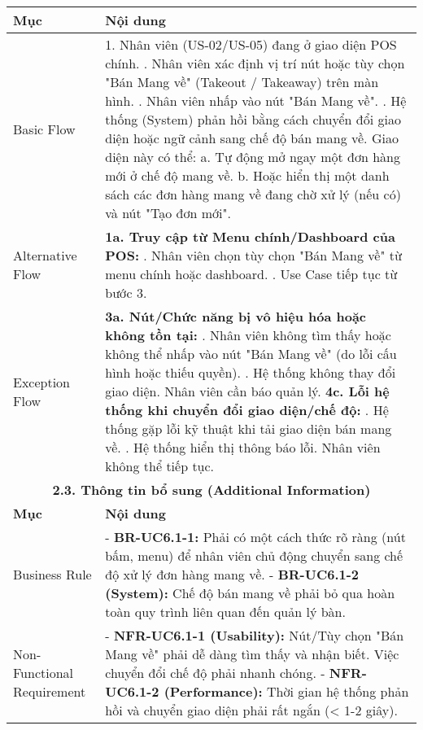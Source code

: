 \begin{longtable}{|m{4cm}|p{11cm}|}
\hline
\textbf{Mục} & \textbf{Nội dung} \\
\hline
Basic Flow & 1. Nhân viên (US-02/US-05) đang ở giao diện POS chính. \newline 2. Nhân viên xác định vị trí nút hoặc tùy chọn "Bán Mang về" (Takeout / Takeaway) trên màn hình. \newline 3. Nhân viên nhấp vào nút "Bán Mang về". \newline 4. Hệ thống (System) phản hồi bằng cách chuyển đổi giao diện hoặc ngữ cảnh sang chế độ bán mang về. Giao diện này có thể: \newline    a. Tự động mở ngay một đơn hàng mới ở chế độ mang về. \newline    b. Hoặc hiển thị một danh sách các đơn hàng mang về đang chờ xử lý (nếu có) và nút "Tạo đơn mới". \\
\hline
Alternative Flow & \textbf{1a. Truy cập từ Menu chính/Dashboard của POS:} \newline    1. Nhân viên chọn tùy chọn "Bán Mang về" từ menu chính hoặc dashboard. \newline    2. Use Case tiếp tục từ bước 3. \\
\hline
Exception Flow & \textbf{3a. Nút/Chức năng bị vô hiệu hóa hoặc không tồn tại:} \newline    1. Nhân viên không tìm thấy hoặc không thể nhấp vào nút "Bán Mang về" (do lỗi cấu hình hoặc thiếu quyền). \newline    2. Hệ thống không thay đổi giao diện. Nhân viên cần báo quản lý. \newline \textbf{4c. Lỗi hệ thống khi chuyển đổi giao diện/chế độ:} \newline    1. Hệ thống gặp lỗi kỹ thuật khi tải giao diện bán mang về. \newline    2. Hệ thống hiển thị thông báo lỗi. Nhân viên không thể tiếp tục. \\
\hline
\multicolumn{2}{|c|}{\textbf{2.3. Thông tin bổ sung (Additional Information)}} \\
\hline
\textbf{Mục} & \textbf{Nội dung} \\
\hline
Business Rule & - \textbf{BR-UC6.1-1:} Phải có một cách thức rõ ràng (nút bấm, menu) để nhân viên chủ động chuyển sang chế độ xử lý đơn hàng mang về. \newline - \textbf{BR-UC6.1-2 (System):} Chế độ bán mang về phải bỏ qua hoàn toàn quy trình liên quan đến quản lý bàn. \\
\hline
Non-Functional Requirement & - \textbf{NFR-UC6.1-1 (Usability):} Nút/Tùy chọn "Bán Mang về" phải dễ dàng tìm thấy và nhận biết. Việc chuyển đổi chế độ phải nhanh chóng. \newline - \textbf{NFR-UC6.1-2 (Performance):} Thời gian hệ thống phản hồi và chuyển giao diện phải rất ngắn (< 1-2 giây). \\
\hline
\end{longtable}

